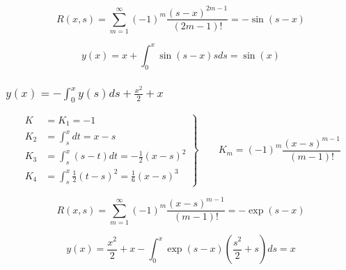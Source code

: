 \documentclass[
11pt,
master, %
subf, %
href, %
colorlinks=true, %
times, %
]{disser}
\begin{document}
$$R(x,s) = \sum_{m=1}^{\infty} (-1)^m\frac{(s-x)^{2m-1}}{(2m-1)!} = -\sin(s-x)$$

$$y(x) = x + \int_{0}^{x} \sin(s-x) s ds = \sin(x)$$

\subsubsection{$\displaystyle y(x) =  -\int_{0}^{x} y(s)ds + \frac{x^2}{2} + x$}

\begin{equation*}
 \left.\begin{aligned}
        K &= K_1 = -1\\
        K_2 &= \int_{s}^{x} dt  = x-s\\
        K_3 &= \int_{s}^{x} (s-t) dt = -\frac{1}{2}(x-s)^2\\
        K_4 &= \int_{s}^{x} \frac{1}{2}(t-s)^2 = \frac{1}{6}(x-s)^3
       \end{aligned}
 \right\}
 \qquad K_m = (-1)^m\frac{(x-s)^{m-1}}{(m-1)!}
\end{equation*}

$$R(x,s) = \sum_{m=1}^{\infty} (-1)^m\frac{(x-s)^{m-1}}{(m-1)!} = -\exp(s-x)$$

$$y(x) = \frac{x^2}{2} + x - \int_{0}^{x} \exp(s-x)\left(\frac{s^2}{2} + s\right) ds = x$$
\end{document}
